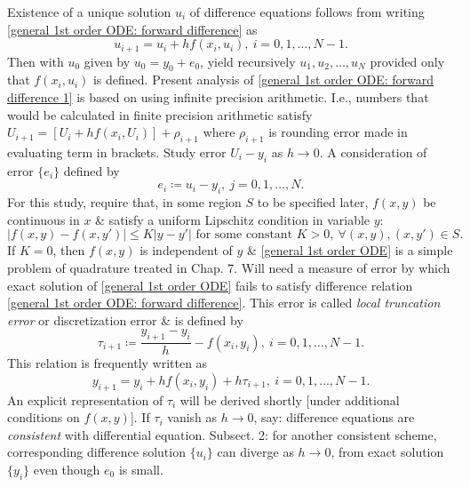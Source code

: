 \documentclass{article}
\begin{document}
\begin{enumerate}
\begin{itemize}
\begin{itemize}
			Existence of a unique solution $u_i$ of difference equations follows from writing \eqref{general 1st order ODE: forward difference} as
			\begin{equation}
				\label{general 1st order ODE: forward difference 1}
				u_{i+1} = u_i + hf(x_i,u_i),\ i = 0,1,\ldots,N - 1.
			\end{equation}
			Then with $u_0$ given by $u_0 = y_0 + e_0$, yield recursively $u_1,u_2,\ldots,u_N$ provided only that $f(x_i,u_i)$ is defined. Present analysis of \eqref{general 1st order ODE: forward difference 1} is based on using infinite precision arithmetic. I.e., numbers that would be calculated in finite precision arithmetic satisfy $U_{i+1} = [U_i + hf(x_i,U_i)] + \rho_{i+1}$ where $\rho_{i+1}$ is rounding error made in evaluating term in brackets. Study error $U_i - y_i$ as $h\to0$. A consideration of error $\{e_i\}$ defined by
			\begin{equation}
				\label{error}
				\tag{err}
				e_i\coloneqq u_i - y_i,\ j = 0,1,\ldots,N.
			\end{equation}
			For this study, require that, in some region $S$ to be specified later, $f(x,y)$ be continuous in $x$ \& satisfy a uniform Lipschitz condition in variable $y$:
			\begin{equation}
				\label{Lipschitz condition}
				|f(x,y) - f(x,y')|\le K|y - y'|\mbox{ for some constant } K > 0,\ \forall(x,y),(x,y')\in S.
			\end{equation}
			If $K = 0$, then $f(x,y)$ is independent of $y$ \& \eqref{general 1st order ODE} is a simple problem of quadrature treated in Chap. 7. Will need a measure of error by which exact solution of \eqref{general 1st order ODE} fails to satisfy difference relation \eqref{general 1st order ODE: forward difference}. This error is called {\it local truncation error} or discretization error \& is defined by
			\begin{equation}
				\label{local truncation error}
				\tau_{i+1}\coloneqq\frac{y_{i+1} - y_i}{h} - f(x_i,y_i),\ i = 0,1,\ldots,N - 1.
			\end{equation}
			This relation is frequently written as
			\begin{equation}
				\label{local truncation error 1}
				y_{i+1} = y_i + hf(x_i,y_i) + h\tau_{i+1},\ i = 0,1,\ldots,N - 1.
			\end{equation}
			An explicit representation of $\tau_i$ will be derived shortly [under additional conditions on $f(x,y)$]. If $\tau_i$ vanish as $h\to0$, say: difference equations are {\it consistent} with differential equation. Subsect. 2: for another consistent scheme, corresponding difference solution $\{u_i\}$ can diverge as $h\to0$, from exact solution $\{y_i\}$ even though $e_0$ is small.
			

\end{itemize}
\end{itemize}
\end{enumerate}
\end{document}

